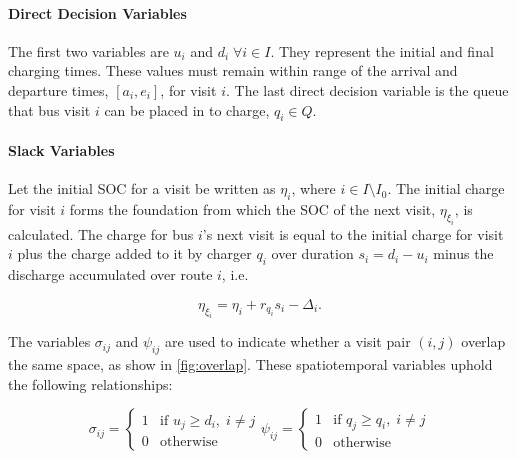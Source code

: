 \documentclass[ee,thesis]{usuthesis}
\newcommand{\Iset}{I}                       %
\newcommand{\Qset}{Q}                       %
\begin{document}
\paragraph{Direct Decision Variables}
\label{sec:direct-decision-variables}
The first two variables are \(u_i\) and \(d_i \; \forall i \in \Iset\). They represent the initial and final charging times. These
values must remain within range of the arrival and departure times, \([a_i, e_i]\), for visit \(i\). The last direct
decision variable is the queue that bus visit \(i\) can be placed in to charge, \(q_i \in \Qset\).

\paragraph{Slack Variables}
\label{sec:slack-decision-variables}
Let the initial SOC for a visit be written as \(\eta_i\), where \(i \in \Iset \setminus \Iset_0\). The initial charge for visit \(i\) forms
the foundation from which the SOC of the next visit, \(\eta_{\xi_i}\), is calculated. The charge for bus \(i\)'s next visit is
equal to the initial charge for visit \(i\) plus the charge added to it by charger \(q_i\) over duration \(s_i = d_i - u_i\)
minus the discharge accumulated over route \(i\), i.e.

\begin{equation}
\label{eq:bat-chain}
  \eta_{\xi_i} = \eta_i + r_{q_i}s_i - \Delta_i\text{.}
\end{equation}

The variables \(\sigma_{ij}\) and \(\psi_{ij}\) are used to indicate whether a visit pair \((i, j)\) overlap the same space, as show
in \ref{fig:overlap}. These spatiotemporal variables uphold the following relationships:

\begin{subequations}
\label{eq:bus-spat-temp}
\begin{equation}
  \sigma_{ij} =
  \begin{cases}
    1 & \text{if } u_j \ge d_i, \; i \ne j\\
    0 & \text{otherwise}
  \end{cases}
\end{equation}

\begin{equation}
  \psi_{ij} =
  \begin{cases}
    1 & \text{if } q_j \ge q_i,\; i \ne j\\
    0 & \text{otherwise}
  \end{cases}
\end{equation}
\end{subequations}
\end{document}
